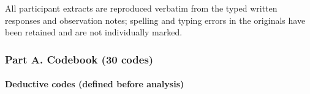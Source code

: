 \documentclass[
]{article}
\begin{document}
All participant extracts are reproduced verbatim from the typed written responses and observation notes; spelling and typing errors in the originals have been retained and are not individually marked.

\hypertarget{part-a.-codebook-30-codes}{%
\subsubsection{Part A. Codebook (30 codes)}\label{part-a.-codebook-30-codes}}

\hypertarget{deductive-codes-defined-before-analysis}{%
\paragraph{Deductive codes (defined before analysis)}\label{deductive-codes-defined-before-analysis}}
\end{document}
